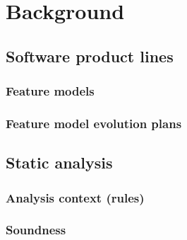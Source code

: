 

\chapter{Background} 

\section{Software product lines}
\subsection{Feature models}
\subsection{Feature model evolution plans}

\section{Static analysis}
\subsection{Analysis context (rules)}
\subsection{Soundness}

